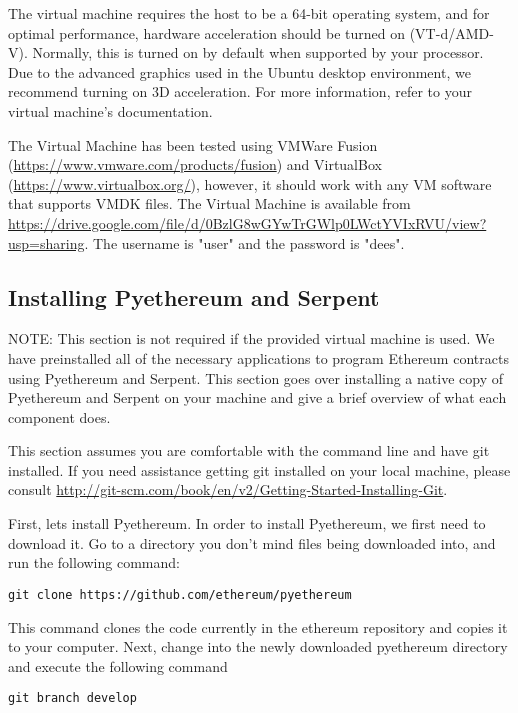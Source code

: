 \documentclass[12pt]{article}
\begin{document}
The virtual machine requires the host to be a 64-bit operating system, and for optimal performance, hardware acceleration should be turned on (VT-d/AMD-V). Normally, this is turned on by default when supported by your processor. Due to the advanced graphics used in the Ubuntu desktop environment, we recommend turning on 3D acceleration. For more information, refer to your virtual machine's documentation.

The Virtual Machine has been tested using VMWare Fusion (\url{https://www.vmware.com/products/fusion}) and VirtualBox (\url{https://www.virtualbox.org/}), however, it should work with any VM software that supports VMDK files. The Virtual Machine is available from \url{https://drive.google.com/file/d/0BzlG8wGYwTrGWlp0LWctYVIxRVU/view?usp=sharing}. The username is "user" and the password is "dees". 

\subsection{Installing Pyethereum and Serpent}
\begin{framed}
NOTE: This section is not required if the provided virtual machine is used. We have preinstalled all of the necessary applications to program Ethereum contracts using Pyethereum and Serpent. This section goes over installing a native copy of Pyethereum and Serpent on your machine and give a brief overview of what each component does.
\end{framed}

This section assumes you are comfortable with the command line and have git installed. If you need assistance getting git installed on your local machine, please consult \url{http://git-scm.com/book/en/v2/Getting-Started-Installing-Git}.

First, lets install Pyethereum. 
In order to install Pyethereum, we first need to download it. Go to a directory you don't mind files being downloaded into, and run the following command:

\begin{verbatim}
git clone https://github.com/ethereum/pyethereum
\end{verbatim}

This command clones the code currently in the ethereum repository and copies it to your computer. Next, change into the newly downloaded pyethereum directory and execute the following command

\begin{verbatim}
git branch develop
\end{verbatim}
\end{document}

